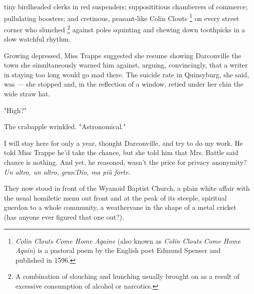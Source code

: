 tiny birdheaded clerks in red suspenders; supposititious 
chamberers of commerce; pullulating 
boosters; and cretinous, 
peasant-like Colin Clouts 
\footnote{\textit{Colin Clouts Come Home Againe} (also known as 
  \textit{Colin Clouts Come Home Again}) is a pastoral poem by the English poet 
  Edmund Spenser and published in 1596.}
on every street corner who slunched 
\footnote{ A combination of slouching and hunching usually brought on as a
  result of excessive consumption of alcohol or narcotics.}
against poles squinting and chewing down toothpicks in a slow watchful rhythm.

  Growing depressed, Miss Trappe suggested she resume showing Darconville the
town she simultaneously warned him against, arguing, convincingly, that a writer
in staying too long would go mad there. The suicide rate in Quinsyburg, she
said, was --- she stopped and, in the reflection of a window, retied under her 
chin the wide straw hat.

  "High?"

  The crabapple wrinkled. "Astronomical."

  I will stay here for only a year, thought Darconville, and try to do my work.
He told Miss Trappe he'd take the chance, but she told him that Mrs. Battle said
chance is nothing. And yet, he reasoned, wasn't the price for privacy anonymity?
\textit{Un altro, un altro, gran'Dio, ma più forte}.

  They now stood in front of the Wyanoid Baptist Church, a plain white affair
with the usual homiletic 
menu out front and at the peak of its steeple, spiritual guerdon 
to a whole community, a weathervane 
in the shape of a metal cricket (has anyone ever figured that one out?).

